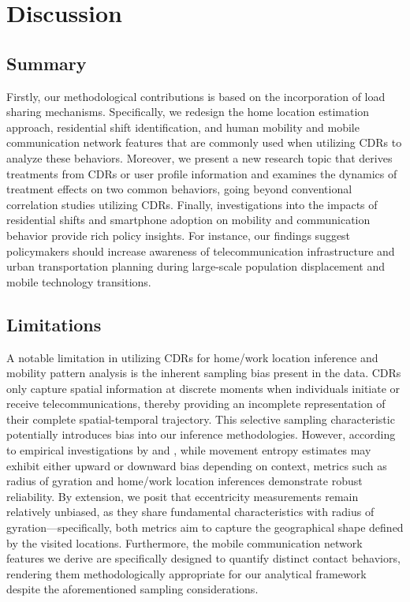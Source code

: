 
\chapter{Discussion}
\section{Summary}
Firstly, our methodological contributions is based on the incorporation of load sharing mechanisms.
Specifically, we redesign the home location estimation approach, residential shift identification, and human mobility and mobile communication network features that are commonly used when utilizing CDRs to analyze these behaviors. Moreover, we present a new research topic that derives treatments from CDRs or user profile information and examines the dynamics of treatment effects on two common behaviors, going beyond conventional correlation studies utilizing CDRs.
Finally, investigations into the impacts of residential shifts and smartphone adoption on mobility and communication behavior provide rich policy insights. For instance, our findings suggest policymakers should increase awareness of telecommunication infrastructure and urban transportation planning during large-scale population displacement and mobile technology transitions.


\section{Limitations}
A notable limitation in utilizing CDRs for home/work location inference and mobility pattern analysis is the inherent sampling bias present in the data.
CDRs only capture spatial information at discrete moments when individuals initiate or receive telecommunications, thereby providing an incomplete representation of their complete spatial-temporal trajectory.
This selective sampling characteristic potentially introduces bias into our inference methodologies.
However, according to empirical investigations by \cite{ranjan2012call} and \cite{zhao2016understanding}, while movement entropy estimates may exhibit either upward or downward bias depending on context, metrics such as radius of gyration and home/work location inferences demonstrate robust reliability.
By extension, we posit that eccentricity measurements remain relatively unbiased, as they share fundamental characteristics with radius of gyration—specifically, both metrics aim to capture the geographical shape defined by the visited locations.
Furthermore, the mobile communication network features we derive are specifically designed to quantify distinct contact behaviors, rendering them methodologically appropriate for our analytical framework despite the aforementioned sampling considerations.

